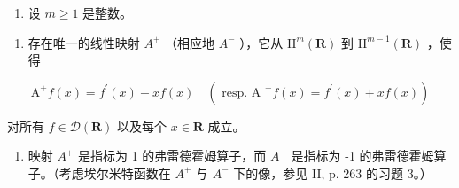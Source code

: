 \begin{enumerate}
\def\labelenumi{\arabic{enumi})}
\setcounter{enumi}{32}
\tightlist
\item
  设 \(m \geqslant 1\) 是整数。
\end{enumerate}

\begin{enumerate}
\def\labelenumi{\alph{enumi})}
\tightlist
\item
  存在唯一的线性映射 \(A^{+}\) （相应地 \(A^{-}\) ），它从 \(\mathrm{H}^{m}(\mathbf{R})\) 到 \(\mathrm{H}^{m-1}(\mathbf{R})\) ，使得
\end{enumerate}

\[
\mathrm{A} ^ {+} f (x) = f ^ {\prime} (x) - x f (x) \quad (\text { resp.   A } ^ {-} f (x) = f ^ {\prime} (x) + x f (x))
\]

对所有 \(f \in \mathcal{D}(\mathbf{R})\) 以及每个 \(x \in \mathbf{R}\) 成立。

\begin{enumerate}
\def\labelenumi{\alph{enumi})}
\setcounter{enumi}{1}
\tightlist
\item
  映射 \(A^{+}\) 是指标为 1 的弗雷德霍姆算子，而 \(A^{-}\) 是指标为 -1 的弗雷德霍姆算子。（考虑埃尔米特函数在 \(A^{+}\) 与 \(A^{-}\) 下的像，参见 II, p. 263 的习题 3。）
\end{enumerate}
